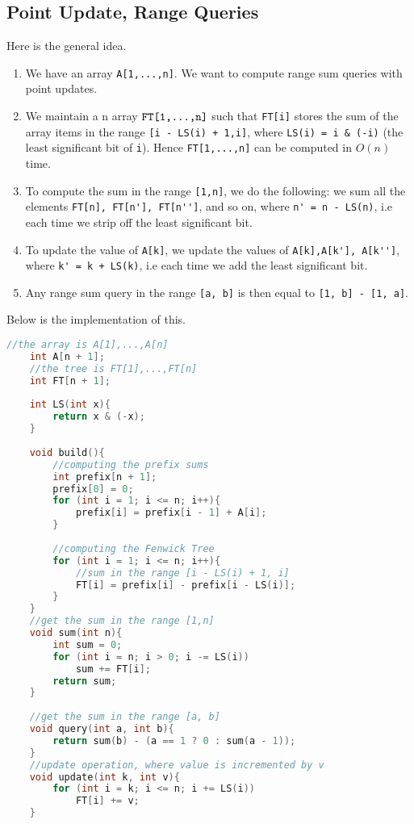 \documentclass[12pt,a4paper]{amsart}
\numberwithin{equation}{section}
\theoremstyle{definition}
\begin{document}
\subsection{Point Update, Range Queries} Here is the general idea.    
\begin{enumerate}
    \item We have an array \verb|A[1,...,n]|. We want to compute range sum queries with point updates.
    \item We maintain a n array $\verb|FT[1,...,n]|$ such that \verb|FT[i]| stores the sum of the array items in the range \verb|[i - LS(i) + 1,i]|, where \verb|LS(i) = i & (-i)| (the least significant bit of \verb|i|). Hence \verb|FT[1,...,n]| can be computed in $O(n)$ time.
    \item To compute the sum in the range \verb|[1,n]|, we do the following: we sum all the elements \verb|FT[n], FT[n'], FT[n'']|, and so on, where \verb|n' = n - LS(n)|, i.e each time we strip off the least significant bit.
    \item To update the value of \verb|A[k]|, we update the values of \verb|A[k],A[k'], A[k'']|, where \verb|k' = k + LS(k)|, i.e each time we add the least significant bit. 
    \item Any range sum query in the range \verb|[a, b]| is then equal to \verb|[1, b] - [1, a]|. 
\end{enumerate}
Below is the implementation of this. 
\begin{lstlisting}[language=C++]
    //the array is A[1],...,A[n]
    int A[n + 1];
    //the tree is FT[1],...,FT[n]
    int FT[n + 1];
    
    int LS(int x){
        return x & (-x);
    }
    
    void build(){
        //computing the prefix sums
        int prefix[n + 1];
        prefix[0] = 0;
        for (int i = 1; i <= n; i++){
            prefix[i] = prefix[i - 1] + A[i];
        }
        
        //computing the Fenwick Tree
        for (int i = 1; i <= n; i++){
            //sum in the range [i - LS(i) + 1, i]
            FT[i] = prefix[i] - prefix[i - LS(i)];
        }
    }
    //get the sum in the range [1,n]
    void sum(int n){
        int sum = 0;
        for (int i = n; i > 0; i -= LS(i))
            sum += FT[i];
        return sum;
    }
    
    //get the sum in the range [a, b]
    void query(int a, int b){
        return sum(b) - (a == 1 ? 0 : sum(a - 1));
    }
    //update operation, where value is incremented by v
    void update(int k, int v){
        for (int i = k; i <= n; i += LS(i))
            FT[i] += v; 
    }
\end{lstlisting}
\end{document}
